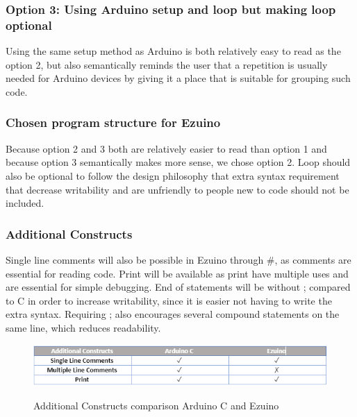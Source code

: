 \subsubsection{Option 3: Using Arduino setup and loop but making loop optional}
Using the same setup method as Arduino is both relatively easy to read as the option 2, but also semantically reminds the user that a repetition is usually needed for Arduino devices by giving it a place that is suitable for grouping such code.


\subsubsection{Chosen program structure for Ezuino}
Because option 2 and 3 both are relatively easier to read than option 1 and because option 3 semantically makes more sense, we chose option 2. Loop should also be optional to follow the design philosophy that extra syntax requirement that decrease writability and are unfriendly to people new to code should not be included.

\subsubsection*{Additional Constructs}
Single line comments will also be possible in Ezuino through \#, as comments are essential for reading code. Print will be available as print have multiple uses and are essential for simple debugging. End of statements will be without ; compared to C in order to increase writability, since it is easier not having to write the extra syntax. Requiring ; also encourages several compound statements on the same line, which reduces readability.
\begin{figure}[H]
\centering
\caption{Additional Constructs comparison Arduino C and Ezuino}
\includegraphics[scale=0.80]{figures/language_features/langf09.png}
\label{lf09}
\end{figure}

